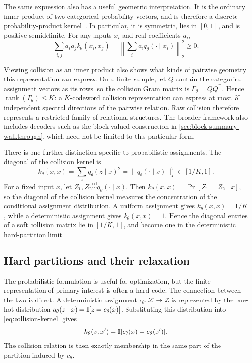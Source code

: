 The same expression also has a useful geometric interpretation.
It is the ordinary inner product of two categorical probability vectors, and is therefore a discrete probability-product kernel~\citep{jebara2004probability}.
In particular, it is symmetric, lies in $[0,1]$, and is positive semidefinite.
For any inputs $x_i$ and real coefficients $a_i$,
\begin{equation}
\sum_{i,j}a_i a_j k_\theta(x_i,x_j)
=\left\|\sum_i a_iq_\theta(\cdot\mid x_i)\right\|_2^2\ge0.
\end{equation}

Viewing collision as an inner product also shows what kinds of pairwise geometry this representation can express.
On a finite sample, let $Q$ contain the categorical assignment vectors as its rows, so the collision Gram matrix is $\Gamma_\theta=QQ^\top$.
Hence $\operatorname{rank}(\Gamma_\theta)\le K$: a $K$-codeword collision representation can express at most $K$ independent spectral directions of the pairwise relation.
Raw collision therefore represents a restricted family of relational structures.
The broader framework also includes decoders such as the block-valued construction in \cref{sec:block-summary-walkthrough}, which need not be limited to this particular form.

There is one further distinction specific to probabilistic assignments.
The diagonal of the collision kernel is
\begin{equation}
k_\theta(x,x)=\sum_zq_\theta(z\mid x)^2
=\|q_\theta(\cdot\mid x)\|_2^2\in[1/K,1].
\label{eq:self-collision}
\end{equation}
For a fixed input $x$, let $Z_1,Z_2\overset{\mathrm{iid}}{\sim}q_\theta(\cdot\mid x)$.
Then $k_\theta(x,x)=\Pr[Z_1=Z_2\mid x]$, so the diagonal of the collision kernel measures the concentration of the conditional assignment distribution.
A uniform assignment gives $k_\theta(x,x)=1/K$, while a deterministic assignment gives $k_\theta(x,x)=1$.
Hence the diagonal entries of a soft collision matrix lie in $[1/K,1]$, and become one in the deterministic hard-partition limit.


\subsection{Hard partitions and their relaxation}

The probabilistic formulation is useful for optimization, but the finite representation of primary interest is often a hard code.
The connection between the two is direct.
A deterministic assignment $c_\theta:\mathcal X\to\mathcal Z$ is represented by the one-hot distribution
$q_\theta(z\mid x)=\mathbb{I}[z=c_\theta(x)]$.
Substituting this distribution into \cref{eq:collision-kernel} gives
\begin{equation}
k_\theta(x,x')=\mathbb{I}[c_\theta(x)=c_\theta(x')].
\label{eq:hard-collision}
\end{equation}
The collision relation is then exactly membership in the same part of the partition induced by $c_\theta$.

